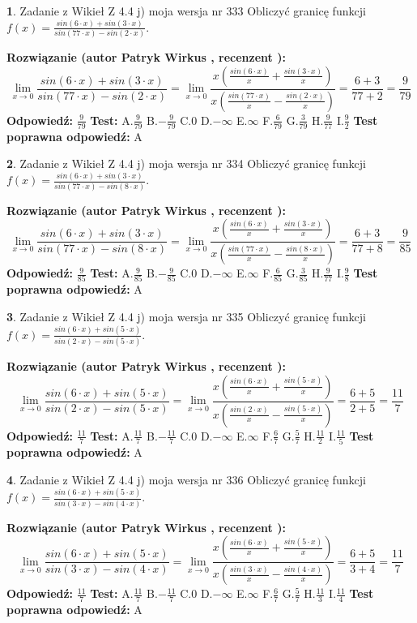 \documentclass[12pt, a4paper]{article}
\theoremstyle{definition} %
\newtheorem{zad}{}
\newcommand{\zadStart}[1]{\begin{zad}#1\newline}
\newcommand{\zadStop}{\end{zad}}
\newcommand{\rozwStart}[2]{\noindent \textbf{Rozwiązanie (autor #1 , recenzent #2): }\newline}
\newcommand{\rozwStop}{\newline}
\newcommand{\odpStart}{\noindent \textbf{Odpowiedź:}\newline}
\newcommand{\odpStop}{\newline}
\newcommand{\testStart}{\noindent \textbf{Test:}\newline}
\newcommand{\testStop}{\newline}
\newcommand{\kluczStart}{\noindent \textbf{Test poprawna odpowiedź:}\newline}
\newcommand{\kluczStop}{\newline}
\begin{document}
\zadStart{Zadanie z Wikieł Z 4.4 j) moja wersja nr 333}
Obliczyć granicę funkcji $f(x)=\frac{sin(6\cdot x) +sin(3\cdot x)}{sin(77\cdot x) -sin(2\cdot x)}$.
\zadStop
\rozwStart{Patryk Wirkus}{}
$$\lim\limits_{x\to 0}\frac{sin(6\cdot x) +sin(3\cdot x)}{sin(77\cdot x) -sin(2\cdot x)}=\lim\limits_{x\to 0}\frac{x(\frac{sin(6\cdot x)}{x}+\frac{sin(3\cdot x)}{x})}{x(\frac{sin(77\cdot x)}{x}-\frac{sin(2\cdot x)}{x})}=\frac{6+3}{77+2} = \frac{9}{79}$$
\rozwStop
\odpStart
$\frac{9}{79}$
\odpStop
\testStart
A.$\frac{9}{79}$
B.$-\frac{9}{79}$
C.$0$
D.$-\infty$
E.$\infty$
F.$\frac{6}{79}$
G.$\frac{3}{79}$
H.$\frac{9}{77}$
I.$\frac{9}{2}$
\testStop
\kluczStart
A
\kluczStop



\zadStart{Zadanie z Wikieł Z 4.4 j) moja wersja nr 334}
Obliczyć granicę funkcji $f(x)=\frac{sin(6\cdot x) +sin(3\cdot x)}{sin(77\cdot x) -sin(8\cdot x)}$.
\zadStop
\rozwStart{Patryk Wirkus}{}
$$\lim\limits_{x\to 0}\frac{sin(6\cdot x) +sin(3\cdot x)}{sin(77\cdot x) -sin(8\cdot x)}=\lim\limits_{x\to 0}\frac{x(\frac{sin(6\cdot x)}{x}+\frac{sin(3\cdot x)}{x})}{x(\frac{sin(77\cdot x)}{x}-\frac{sin(8\cdot x)}{x})}=\frac{6+3}{77+8} = \frac{9}{85}$$
\rozwStop
\odpStart
$\frac{9}{85}$
\odpStop
\testStart
A.$\frac{9}{85}$
B.$-\frac{9}{85}$
C.$0$
D.$-\infty$
E.$\infty$
F.$\frac{6}{85}$
G.$\frac{3}{85}$
H.$\frac{9}{77}$
I.$\frac{9}{8}$
\testStop
\kluczStart
A
\kluczStop



\zadStart{Zadanie z Wikieł Z 4.4 j) moja wersja nr 335}
Obliczyć granicę funkcji $f(x)=\frac{sin(6\cdot x) +sin(5\cdot x)}{sin(2\cdot x) -sin(5\cdot x)}$.
\zadStop
\rozwStart{Patryk Wirkus}{}
$$\lim\limits_{x\to 0}\frac{sin(6\cdot x) +sin(5\cdot x)}{sin(2\cdot x) -sin(5\cdot x)}=\lim\limits_{x\to 0}\frac{x(\frac{sin(6\cdot x)}{x}+\frac{sin(5\cdot x)}{x})}{x(\frac{sin(2\cdot x)}{x}-\frac{sin(5\cdot x)}{x})}=\frac{6+5}{2+5} = \frac{11}{7}$$
\rozwStop
\odpStart
$\frac{11}{7}$
\odpStop
\testStart
A.$\frac{11}{7}$
B.$-\frac{11}{7}$
C.$0$
D.$-\infty$
E.$\infty$
F.$\frac{6}{7}$
G.$\frac{5}{7}$
H.$\frac{11}{2}$
I.$\frac{11}{5}$
\testStop
\kluczStart
A
\kluczStop



\zadStart{Zadanie z Wikieł Z 4.4 j) moja wersja nr 336}
Obliczyć granicę funkcji $f(x)=\frac{sin(6\cdot x) +sin(5\cdot x)}{sin(3\cdot x) -sin(4\cdot x)}$.
\zadStop
\rozwStart{Patryk Wirkus}{}
$$\lim\limits_{x\to 0}\frac{sin(6\cdot x) +sin(5\cdot x)}{sin(3\cdot x) -sin(4\cdot x)}=\lim\limits_{x\to 0}\frac{x(\frac{sin(6\cdot x)}{x}+\frac{sin(5\cdot x)}{x})}{x(\frac{sin(3\cdot x)}{x}-\frac{sin(4\cdot x)}{x})}=\frac{6+5}{3+4} = \frac{11}{7}$$
\rozwStop
\odpStart
$\frac{11}{7}$
\odpStop
\testStart
A.$\frac{11}{7}$
B.$-\frac{11}{7}$
C.$0$
D.$-\infty$
E.$\infty$
F.$\frac{6}{7}$
G.$\frac{5}{7}$
H.$\frac{11}{3}$
I.$\frac{11}{4}$
\testStop
\kluczStart
A
\kluczStop
\end{document}
